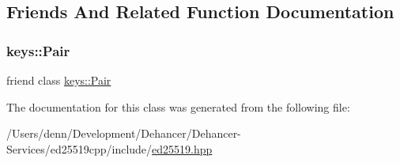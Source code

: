 \subsection{Friends And Related Function Documentation}
\mbox{\label{classed25519_1_1_signature_ad89670fe663c8c8526b69b1bc6a87c19}} 
\subsubsection{\texorpdfstring{keys\+::\+Pair}{keys::Pair}}
{\footnotesize\ttfamily friend class \mbox{\hyperlink{classed25519_1_1keys_1_1_pair}{keys\+::\+Pair}}\hspace{0.3cm}{\ttfamily [friend]}}



The documentation for this class was generated from the following file\+:\begin{DoxyCompactItemize}
\item 
/\+Users/denn/\+Development/\+Dehancer/\+Dehancer-\/\+Services/ed25519cpp/include/\mbox{\hyperlink{ed25519_8hpp}{ed25519.\+hpp}}\end{DoxyCompactItemize}
